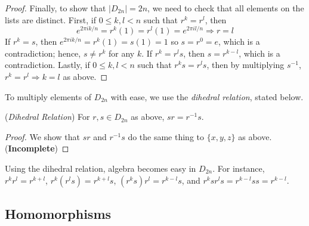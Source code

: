 \documentclass[10pt, a4paper, twoside]{report}
\begin{document}
\begin{proof}
    Finally, to show that \(|D_{2n}|=2n\), we need to check that all elements on the lists are distinct. First, if \(0\leq k,l< n\) such that \(r^k=r^l\), then 
    \[e^{2\pi ik/n}=r^k(1)=r^l(1)=e^{2\pi il/n}\Rightarrow r=l\]
    If \(r^k=s\), then \(e^{2\pi ik/n}=r^k(1)=s(1)=1\) so \(s=r^0=e\), which is a contradiction; hence, \(s\neq r^k\) for any \(k\). If \(r^k=r^ls\), then \(s=r^{k-l}\), which is a contradiction. Lastly, if \(0\leq k,l<n\) such that \(r^ks=r^ls\), then by multiplying \(s^{-1}\), \(r^k=r^l\Rightarrow k=l\) as above.
\end{proof}
To multiply elements of \(D_{2n}\) with ease, we use the \emph{dihedral relation}, stated below.
\begin{lemma}
    (\emph{Dihedral Relation}) For \(r,s\in D_{2n}\) as above, \(sr=r^{-1}s\).
\end{lemma}
\begin{proof}
    We show that \(sr\) and \(r^{-1}s\) do the same thing to \(\{x,y,z\}\) as above. (\textbf{Incomplete})
\end{proof}
Using the dihedral relation, algebra becomes easy in \(D_{2n}\). For instance, \(r^kr^l=r^{k+l}\), \(r^k(r^ls)=r^{k+l}s\), \((r^ks)r^l=r^{k-l}s\), and \(r^ksr^ls=r^{k-l}ss=r^{k-l}\).
\subsection{Homomorphisms}
\end{document}
